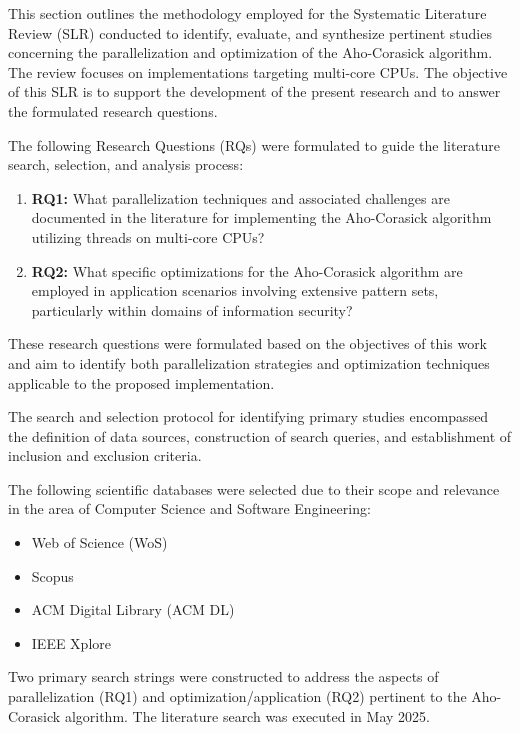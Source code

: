 
This section outlines the methodology employed for the Systematic Literature Review (SLR) conducted to identify, evaluate, and synthesize pertinent studies concerning the parallelization and optimization of the Aho-Corasick algorithm. The review focuses on implementations targeting multi-core CPUs. The objective of this SLR is to support the development of the present research and to answer the formulated research questions.


The following Research Questions (RQs) were formulated to guide the literature search, selection, and analysis process:
\begin{enumerate}
    \item \textbf{RQ1:} What parallelization techniques and associated challenges are documented in the literature for implementing the Aho-Corasick algorithm utilizing threads on multi-core CPUs?
    \item \textbf{RQ2:} What specific optimizations for the Aho-Corasick algorithm are employed in application scenarios involving extensive pattern sets, particularly within domains of information security?
\end{enumerate}

These research questions were formulated based on the objectives of this work and aim to identify both parallelization strategies and optimization techniques applicable to the proposed implementation.


The search and selection protocol for identifying primary studies encompassed the definition of data sources, construction of search queries, and establishment of inclusion and exclusion criteria.

The following scientific databases were selected due to their scope and relevance in the area of ​​Computer Science and Software Engineering:
\begin{itemize}
    \item Web of Science (WoS)
    \item Scopus
    \item ACM Digital Library (ACM DL)
    \item IEEE Xplore
\end{itemize}


Two primary search strings were constructed to address the aspects of parallelization (RQ1) and optimization/application (RQ2) pertinent to the Aho-Corasick algorithm. The literature search was executed in May 2025.


